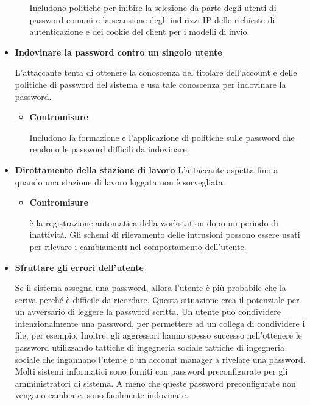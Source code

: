 \begin{itemize}
\begin{itemize}
        Includono politiche per inibire la selezione da parte degli utenti di password comuni e la scansione degli indirizzi IP delle richieste di autenticazione e dei cookie del client per i modelli di invio.
    \end{itemize}

\item\textbf{Indovinare la password contro un singolo utente}

L'attaccante tenta di ottenere la conoscenza del titolare dell'account e delle politiche di password del sistema e usa tale conoscenza per indovinare la password.

    \begin{itemize}
        \item \textbf{Contromisure}
        
        Includono la formazione e l'applicazione di politiche sulle password che rendono le password difficili da indovinare.
    \end{itemize} 

\item\textbf{Dirottamento della stazione di lavoro}
L'attaccante aspetta fino a quando una stazione di lavoro loggata non è sorvegliata.

\begin{itemize}
    \item\textbf{Contromisure}
    
    è la registrazione automatica della workstation dopo un periodo di inattività. Gli schemi di rilevamento delle intrusioni possono essere usati per rilevare i cambiamenti nel comportamento dell'utente.
\end{itemize}

\item \textbf{Sfruttare gli errori dell'utente}

Se il sistema assegna una password, allora l'utente è più probabile che la scriva perché è difficile da ricordare. Questa situazione crea il potenziale per un avversario di leggere la password scritta. Un utente può condividere intenzionalmente una password, per permettere ad un collega di condividere i file, per esempio. Inoltre, gli aggressori hanno spesso successo nell'ottenere le password utilizzando tattiche di ingegneria sociale tattiche di ingegneria sociale che ingannano l'utente o un account manager a rivelare una password. Molti sistemi informatici sono forniti con password preconfigurate per gli amministratori di sistema. A meno che queste password preconfigurate non vengano cambiate, sono facilmente indovinate.


\end{itemize}
